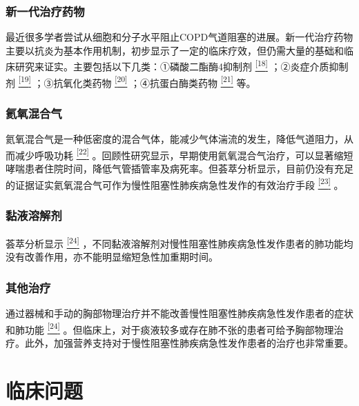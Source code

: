 \subsubsection{新一代治疗药物}

最近很多学者尝试从细胞和分子水平阻止COPD气道阻塞的进展。新一代治疗药物主要以抗炎为基本作用机制，初步显示了一定的临床疗效，但仍需大量的基础和临床研究来证实。主要包括以下几类：①磷酸二酯酶4抑制剂
\protect\hyperlink{text00012.htmlux5cux23ch18-11}{\textsuperscript{{[}18{]}}}
；②炎症介质抑制剂
\protect\hyperlink{text00012.htmlux5cux23ch19-11}{\textsuperscript{{[}19{]}}}
；③抗氧化类药物
\protect\hyperlink{text00012.htmlux5cux23ch20-11}{\textsuperscript{{[}20{]}}}
；④抗蛋白酶类药物
\protect\hyperlink{text00012.htmlux5cux23ch21-11}{\textsuperscript{{[}21{]}}}
等。

\subsubsection{氦氧混合气}

氦氧混合气是一种低密度的混合气体，能减少气体湍流的发生，降低气道阻力，从而减少呼吸功耗
\protect\hyperlink{text00012.htmlux5cux23ch22-11}{\textsuperscript{{[}22{]}}}
。回顾性研究显示，早期使用氦氧混合气治疗，可以显著缩短哮喘患者住院时间，降低气管插管率及病死率。但荟萃分析显示，目前仍没有充足的证据证实氦氧混合气可作为慢性阻塞性肺疾病急性发作的有效治疗手段
\protect\hyperlink{text00012.htmlux5cux23ch23-11}{\textsuperscript{{[}23{]}}}
。

\subsubsection{黏液溶解剂}

荟萃分析显示
\protect\hyperlink{text00012.htmlux5cux23ch24-11}{\textsuperscript{{[}24{]}}}
，不同黏液溶解剂对慢性阻塞性肺疾病急性发作患者的肺功能均没有改善作用，亦不能明显缩短急性加重期时间。

\subsubsection{其他治疗}

通过器械和手动的胸部物理治疗并不能改善慢性阻塞性肺疾病急性发作患者的症状和肺功能
\protect\hyperlink{text00012.htmlux5cux23ch24-11}{\textsuperscript{{[}24{]}}}
。但临床上，对于痰液较多或存在肺不张的患者可给予胸部物理治疗。此外，加强营养支持对于慢性阻塞性肺疾病急性发作患者的治疗也非常重要。

\section{临床问题}

